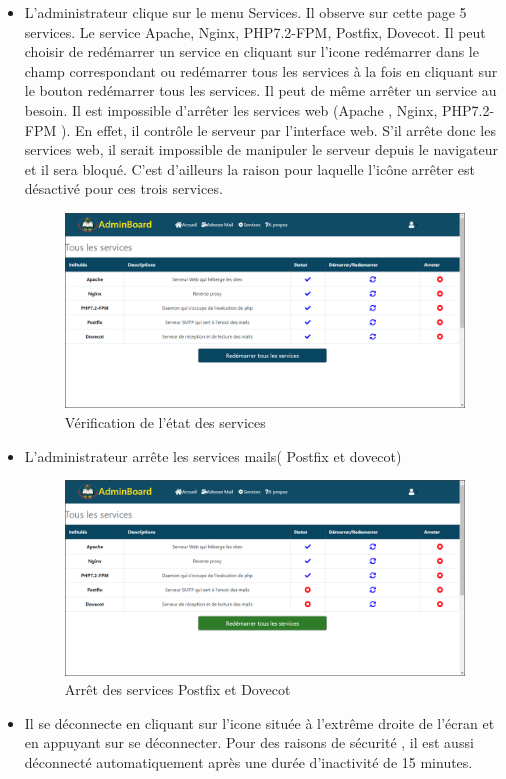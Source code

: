 \documentclass[a4paper,12pt,french]{report} %
\begin{document}
\begin{itemize}
\item L'administrateur clique sur le menu Services. Il observe sur cette page 5 services. Le service Apache, Nginx, PHP7.2-FPM, Postfix, Dovecot. Il peut choisir de redémarrer un service en cliquant sur l'icone redémarrer dans le champ correspondant ou redémarrer tous les services à la fois en cliquant sur le bouton redémarrer tous les services. Il peut de même arrêter un service au besoin. Il est impossible d'arrêter les services web (Apache , Nginx, PHP7.2-FPM ). En effet, il contrôle le serveur par l'interface web. S'il arrête donc les services web, il serait impossible de manipuler le serveur depuis le navigateur et il sera bloqué. C'est d'ailleurs la raison pour laquelle l'icône arrêter est désactivé pour ces trois services.
\begin{figure}[H]
\centering
\includegraphics[width=483pt]{figure/admin_verify_state_of_service.png}
\caption{Vérification de l'état des services}
\end{figure}  

\item L'administrateur arrête les services mails( Postfix et dovecot)
\begin{figure}[H]
\centering
\includegraphics[width=483pt]{figure/admin_stop_service_mail.png}
\caption{Arrêt des services Postfix et Dovecot}
\end{figure}  

\item Il se déconnecte en cliquant sur l'icone située à l'extrême droite de l'écran et en appuyant sur se déconnecter. Pour des raisons de sécurité , il est aussi déconnecté automatiquement après une durée d'inactivité de 15 minutes. 

\end{itemize}
\end{document}
